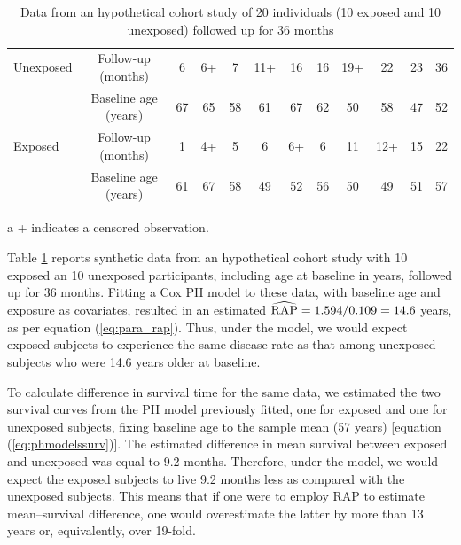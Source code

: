 \begin{table}[]
\begin{center}
\caption[Data from an hypothetical cohort study of 20 individuals followed up for 36 months]{Data from an hypothetical cohort study of 20 individuals (10 exposed and 10 unexposed) followed up for 36 months}
\label{table:examplesurvival}
\begin{adjustbox}{max width=\textwidth}
\begin{threeparttable}
\begin{tabular}{l|c|cccccccccc}
 \hline
 Unexposed & Follow-up (months)\tnote{a} & 6 & 6+ & 7 & 11+ & 16 & 16 & 19+ & 22 & 23 & 36 \\
 \cline{2-12} & Baseline age (years)  & 67 & 65 & 58 & 61 & 67 & 62 & 50 & 58 & 47 & 52 \\ \hline \hline
 Exposed & Follow-up (months)\tnote{a} & 1 & 4+ & 5 & 6 & 6+ & 6 & 11 & 12+ & 15 & 22 \\
 \cline{2-12} & Baseline age (years) & 61 & 67 & 58 & 49 & 52 & 56 & 50 & 49 & 51 & 57 \\ \hline
\end{tabular}
\begin{tablenotes}
\item [a]\footnotesize + indicates a censored observation.
\end{tablenotes}
\end{threeparttable}
\end{adjustbox}
\end{center}
\end{table}

Table \ref{table:examplesurvival} reports synthetic data from an hypothetical cohort study with 10 exposed an 10 unexposed participants, including age at baseline in years, followed up for 36 months. Fitting a Cox PH model to these data, with baseline age and exposure as covariates, resulted in an estimated $\widehat{\operatorname{RAP}}= 1.594 / 0.109 = 14.6$ years, as per equation (\ref{eq:para_rap}). Thus, under the model, we would expect exposed subjects to experience the same disease rate as that among unexposed subjects who were 14.6 years older at baseline.  

To calculate difference in survival time for the same data, we estimated the two survival curves from the PH model previously fitted, one for exposed and one for unexposed subjects, fixing baseline age to the sample mean (57 years) [equation (\ref{eq:phmodelssurv})]. The estimated difference in mean survival between exposed and unexposed was equal to 9.2 months. Therefore, under the model, we would expect the exposed subjects to live 9.2 months less as compared with the unexposed subjects. This means that if one were to employ RAP to estimate mean--survival difference, one would overestimate the latter by more than 13 years or, equivalently, over 19-fold.

